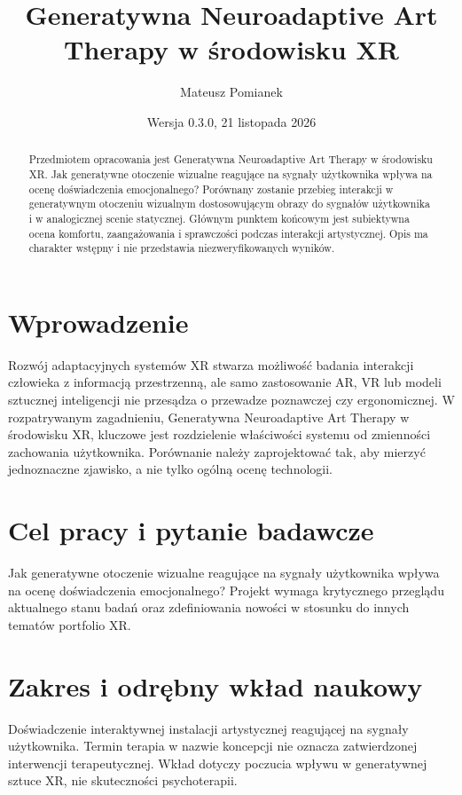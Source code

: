 \documentclass[11pt,a4paper]{article}
\title{Generatywna Neuroadaptive Art Therapy w środowisku XR}
\author{Mateusz Pomianek}
\date{Wersja 0.3.0, 21 listopada 2026}
\begin{document}
\maketitle

\begin{abstract}

Przedmiotem opracowania jest Generatywna Neuroadaptive Art Therapy w środowisku XR. Jak generatywne otoczenie wizualne reagujące na sygnały użytkownika wpływa na ocenę doświadczenia emocjonalnego? Porównany zostanie przebieg interakcji w generatywnym otoczeniu wizualnym dostosowującym obrazy do sygnałów użytkownika i w analogicznej scenie statycznej. Głównym punktem końcowym jest subiektywna ocena komfortu, zaangażowania i sprawczości podczas interakcji artystycznej. Opis ma charakter wstępny i nie przedstawia niezweryfikowanych wyników.

\end{abstract}

\section{Wprowadzenie}

Rozwój adaptacyjnych systemów XR stwarza możliwość badania interakcji człowieka z informacją przestrzenną, ale samo zastosowanie AR, VR lub modeli sztucznej inteligencji nie przesądza o przewadze poznawczej czy ergonomicznej. W rozpatrywanym zagadnieniu, Generatywna Neuroadaptive Art Therapy w środowisku XR, kluczowe jest rozdzielenie właściwości systemu od zmienności zachowania użytkownika. Porównanie należy zaprojektować tak, aby mierzyć jednoznaczne zjawisko, a nie tylko ogólną ocenę technologii.

\section{Cel pracy i pytanie badawcze}

Jak generatywne otoczenie wizualne reagujące na sygnały użytkownika wpływa na ocenę doświadczenia emocjonalnego? Projekt wymaga krytycznego przeglądu aktualnego stanu badań oraz zdefiniowania nowości w stosunku do innych tematów portfolio XR.

\section{Zakres i odrębny wkład naukowy}
Doświadczenie interaktywnej instalacji artystycznej reagującej na sygnały użytkownika. Termin terapia w nazwie koncepcji nie oznacza zatwierdzonej interwencji terapeutycznej. Wkład dotyczy poczucia wpływu w generatywnej sztuce XR, nie skuteczności psychoterapii.
\end{document}
